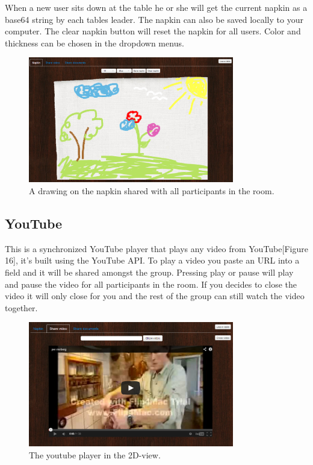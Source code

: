 \documentclass[12pt, titlepage]{article}
\begin{document}
When a new user sits down at the table he or she will get the current napkin as a base64 string by each tables leader. The napkin can also be saved locally to your computer. The clear napkin button will reset the napkin for all users. Color and thickness can be chosen in the dropdown menus.
\begin{figure}[H]
  \centering
	\includegraphics[width=0.8\textwidth,keepaspectratio]{theNapkin.png}
  \caption{A drawing on the napkin shared with all participants in the room.}
\end{figure}
\subsection{YouTube}
This is a synchronized YouTube player that plays any video from YouTube[Figure 16], it's built using the YouTube API. To play a video you paste an URL into a field and it will be shared amongst the group. Pressing play or pause will play and pause the video for all participants in the room. If you decides to close the video it will only close for you and the rest of the group can still watch the video together.
\begin{figure}[H]
  \centering
	\includegraphics[width=0.8\textwidth,keepaspectratio]{youtubeToReport.png}
  \caption{The youtube player in the 2D-view.}
\end{figure}
\end{document}
